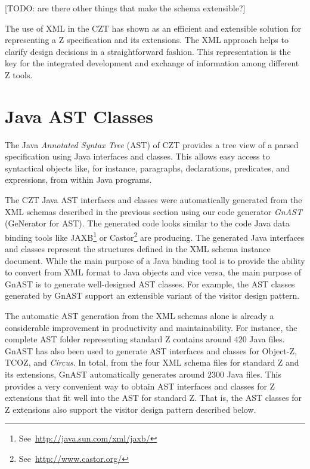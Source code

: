 \documentclass{llncs}
\newcommand{\Circus}{{\sf\slshape Circus}}
\begin{document}
  [TODO: are there other things that make the schema extensible?]

  The use of XML in the CZT has shown as an efficient and extensible
  solution for representing a Z specification and its extensions.  The
  XML approach helps to clarify design decisions in a straightforward
  fashion.  This representation is the key for the integrated
  development and exchange of information among different Z tools.

\section{Java AST Classes}\label{java-ast-classes}

  The Java \emph{Annotated Syntax Tree} (AST) of CZT provides a tree view of
  a parsed specification using Java interfaces and classes.  This
  allows easy access to syntactical objects like, for instance,
  paragraphs, declarations, predicates, and expressions, from within
  Java programs.

  The CZT Java AST interfaces and classes were automatically generated
  from the XML schemas described in the previous section using our
  code generator \emph{GnAST} (GeNerator for AST).  The generated code
  looks similar to the code Java data binding tools like
  JAXB\footnote{See~\url{http://java.sun.com/xml/jaxb/}} or
  Castor\footnote{See~\url{http://www.castor.org/}} are producing.  The
  generated Java interfaces and classes represent the structures
  defined in the XML schema instance document.  While the main purpose
  of a Java binding tool is to provide the ability to convert from XML
  format to Java objects and vice versa, the main purpose of GnAST is
  to generate well-designed AST classes.  For example, the AST classes
  generated by GnAST support an extensible variant of the visitor
  design pattern.

  The automatic AST generation from the XML schemas alone is already a
  considerable improvement in productivity and maintainability.  For
  instance, the complete AST folder representing standard Z contains
  around $420$ Java files.  GnAST has also been used to generate AST
  interfaces and classes for Object-Z, TCOZ, and \Circus.  In total,
  from the four XML schema files for standard Z and its extensions, GnAST
  automatically generates around $2300$ Java files.  This provides a
  very convenient way to obtain AST interfaces and classes for Z
  extensions that fit well into the AST for standard Z.  That is, the
  AST classes for Z extensions also support the visitor design pattern
  described below.
\end{document}
